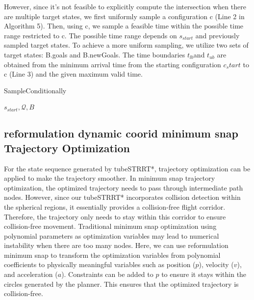 \documentclass[times,authoryear]{elsarticle}
\newcommand{\Input}{\item[\textbf{Input:}]}
\begin{document}
However, since it's not feasible to explicitly compute the intersection when there are multiple target states, we first uniformly sample a configuration c (Line 2 in Algorithm 5). Then, using c, we sample a feasible time within the possible time range restricted to c. The possible time range depends on $s_{start}$ and previously sampled target states. To achieve a more uniform sampling, we utilize two sets of target states: B.goals and B.newGoals. The time boundaries $t_{lb}$and $t_{ub}$ are obtained from the minimum arrival time from the starting configuration $c_start$ to c (Line 3) and the given maximum valid time.

\begin{algorithm}[H]
	\caption[short]{SampleConditionally}
	\begin{algorithmic}[1]
		\Input{$s_{start},\mathcal{Q},B$}
		\WHILE{}
		\ELSE{}
		\ENDIF{}
		\ENDWHILE{}
	\end{algorithmic}
\end{algorithm}

\subsection{reformulation dynamic coorid minimum snap Trajectory Optimization}
For the state sequence generated by tubeSTRRT*, trajectory optimization can be applied to make the trajectory smoother. In minimum snap trajectory optimization, the optimized trajectory needs to pass through intermediate path nodes. However, since our tubeSTRRT* incorporates collision detection within the spherical regions, it essentially provides a collision-free flight corridor. Therefore, the trajectory only needs to stay within this corridor to ensure collision-free movement. Traditional minimum snap optimization using polynomial parameters as optimization variables may lead to numerical instability when there are too many nodes. Here, we can use reformulation minimum snap to transform the optimization variables from polynomial coefficients to physically meaningful variables such as position ($p$), velocity ($v$), and acceleration ($a$). Constraints can be added to $p$ to ensure it stays within the circles generated by the planner. This ensures that the optimized trajectory is collision-free.
\end{document}
